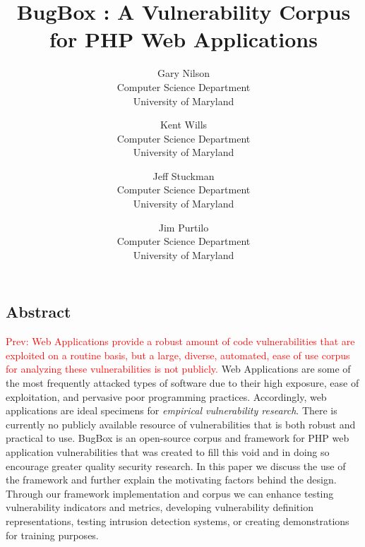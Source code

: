 \documentclass[letterpaper,twocolumn,10pt]{article}
\begin{document}
\date{}


\title{\Large \bf BugBox : A Vulnerability Corpus for PHP Web Applications}


\author{
{\rm Gary Nilson}\\
Computer Science Department\\University of Maryland
\and
{\rm Kent Wills}\\
Computer Science Department\\University of Maryland
\and
{\rm Jeff Stuckman}\\
Computer Science Department\\University of Maryland
\and
{\rm Jim Purtilo}\\
Computer Science Department\\University of Maryland
} %

\maketitle

\thispagestyle{empty}

\subsection*{Abstract}

\textcolor{red}{Prev: Web Applications provide a robust amount of code vulnerabilities that are exploited on a routine basis, but a large, diverse, automated, ease of use corpus for analyzing these vulnerabilities is not publicly.}
Web Applications are some of the most frequently attacked types of software due to their high exposure, ease of exploitation, and pervasive poor programming practices. Accordingly, web applications are ideal specimens for \emph{empirical vulnerability research}. There is currently no publicly available resource of vulnerabilities that is both robust and practical to use. BugBox is an open-source corpus and framework for PHP web application vulnerabilities that was created to fill this void and in doing so encourage greater quality security research. In this paper we discuss the use of the framework and further explain the motivating factors behind the design. Through our framework implementation and corpus we can enhance testing vulnerability indicators and metrics, developing vulnerability definition representations, testing intrusion detection systems, or creating demonstrations for training purposes.  
\end{document}
